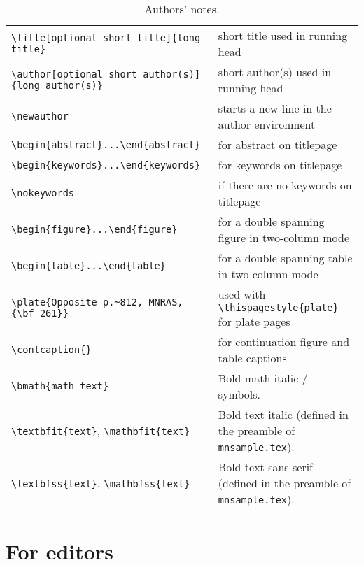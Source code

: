 \begin{table*}
\begin{minipage}{155mm}
\caption{Authors' notes.}
\label{authors}
\begin{tabular}{@{}ll}
\verb"\title[optional short title]{long title}"
                    & short title used in running head\\
\verb"\author[optional short author(s)]{long author(s)}"
                    & short author(s) used in running head\\
\verb"\newauthor"   & starts a new line in the author environment\\
\verb"\begin{abstract}...\end{abstract}"& for abstract on titlepage\\
\verb"\begin{keywords}...\end{keywords}"& for keywords on titlepage\\
\verb"\nokeywords"  & if there are no keywords on titlepage\\
\verb"\begin{figure*}...\end{figure*}" & for a double spanning figure in two-column mode\\ 
\verb"\begin{table*}...\end{table*}" & for a double spanning table in 
                                       two-column mode\\ 
\verb"\plate{Opposite p.~812, MNRAS, {\bf 261}}"
                  & used with \verb"\thispagestyle{plate}" for plate pages\\
\verb"\contcaption{}" & for continuation figure and table captions\\
\verb"\bmath{math text}" & Bold math italic / symbols.\\
\verb"\textbfit{text}", \verb"\mathbfit{text}" & Bold text italic
   (defined in the preamble of \verb"mnsample.tex").\\
\verb"\textbfss{text}", \verb"\mathbfss{text}" & Bold text sans serif
   (defined in the preamble of \verb"mnsample.tex").\\
\end{tabular}
\end{minipage}
\end{table*}


\section{For editors}

